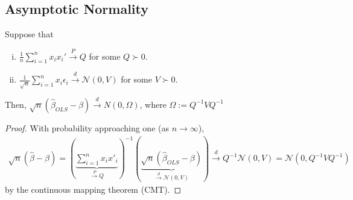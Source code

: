 \documentclass[11pt]{elegantbook}
\begin{document}
\subsection{Asymptotic Normality}
\begin{lemma}\label{lemma:asymptotic_normality}
    Suppose that
    \begin{enumerate}[(i).]
        \item $\frac{1}{n}\sum_{i=1}^n x_ix_i' \stackrel{P}{\longrightarrow} Q$ for some $Q\succ 0$.
        \item $\frac{1}{\sqrt{n}}\sum_{i=1}^n x_i\epsilon_i \stackrel{d}{\longrightarrow} \mathcal{N}(0,V)$ for some $V\succ 0$.
    \end{enumerate}
    Then, $\sqrt{n}\left(\hat{\beta}_{OLS}-\beta\right) \stackrel{d}{\longrightarrow} N\left(0,\Omega\right)$, where $\Omega:=Q^{-1} V Q^{-1}$
\end{lemma}
\begin{proof}
    With probability approaching one (as $n\to\infty$),
    \begin{equation}
        \begin{aligned}
            \sqrt{n}(\hat{\beta}-\beta)=\left(\underbrace{\sum_{i=1}^n x_ix'_i}_{\stackrel{P}{\longrightarrow} Q}\right)^{-1}\left(\underbrace{\sqrt{n}\left(\hat{\beta}_{OLS}-\beta\right)}_{\stackrel{d}{\longrightarrow} \mathcal{N}(0,V)}\right)\stackrel{d}{\longrightarrow} Q^{-1}\mathcal{N}(0,V)=\mathcal{N}(0,Q^{-1}VQ^{-1})
        \end{aligned}
        \nonumber
    \end{equation}
    by the continuous mapping theorem (CMT).
\end{proof}
\end{document}
